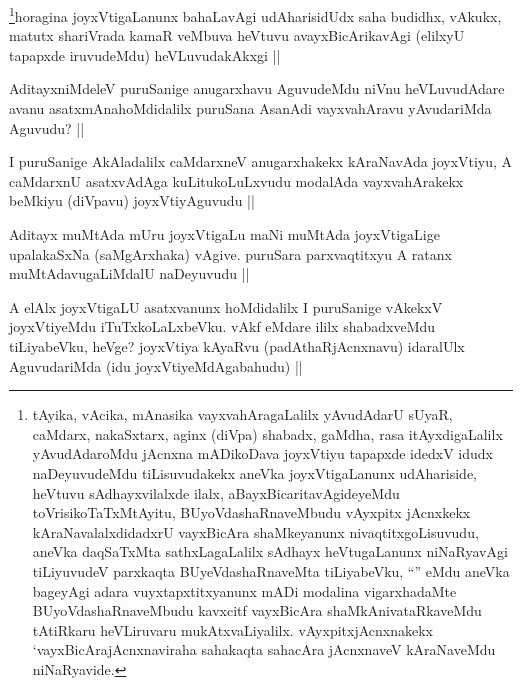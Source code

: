 \begin{artha}
\footnote{tAyika, vAcika, mAnasika vayxvahAragaLalilx yAvudAdarU sUyaR, caMdarx, nakaSxtarx, aginx (diVpa) shabadx, gaMdha, rasa itAyxdigaLalilx yAvudAdaroMdu jAcnxna mADikoDava joyxVtiyu tapapxde idedxV idudx naDeyuvudeMdu tiLisuvudakekx aneVka joyxVtigaLanunx udAhariside, heVtuvu sAdhayxvilalxde ilalx, aBayxBicaritavAgideyeMdu toVrisikoTaTxMtAyitu, BUyoVdashaRnaveMbudu vAyxpitx jAcnxkekx kAraNavalalxdidadxrU vayxBicAra shaMkeyanunx nivaqtitxgoLisuvudu, aneVka daqSaTxMta sathxLagaLalilx sAdhayx heVtugaLanunx niNaRyavAgi tiLiyuvudeV parxkaqta BUyeVdashaRnaveMta tiLiyabeVku, ``\stext'' eMdu aneVka bageyAgi adara vuyxtapxtitxyanunx mADi modalina vigarxhadaMte BUyoVdashaRnaveMbudu kavxcitf vayxBicAra shaMkAnivataRkaveMdu tAtiRkaru heVLiruvaru mukAtxvaLiyalilx. vAyxpitxjAcnxnakekx `vayxBicArajAcnxnaviraha sahakaqta sahacAra jAcnxnaveV kAraNaveMdu niNaRyavide.}horagina joyxVtigaLanunx bahaLavAgi udAharisidUdx saha budidhx, vAkukx, matutx shariVrada kamaR veMbuva heVtuvu avayxBicArikavAgi (elilxyU tapapxde iruvudeMdu) heVLuvudakAkxgi ||
\end{artha}

\begin{artha}
AditayxniMdeleV puruSanige anugarxhavu AguvudeMdu niVnu heVLuvudAdare avanu asatxmAnahoMdidalilx puruSana AsanAdi vayxvahAravu yAvudariMda Aguvudu? ||
\end{artha}

\begin{artha}
I puruSanige AkAladalilx caMdarxneV anugarxhakekx kAraNavAda joyxVtiyu, A caMdarxnU asatxvAdAga kuLitukoLuLxvudu modalAda vayxvahArakekx beMkiyu (diVpavu) joyxVtiyAguvudu ||
\end{artha}

\begin{artha}
Aditayx muMtAda mUru joyxVtigaLu maNi muMtAda joyxVtigaLige upalakaSxNa (saMgArxhaka) vAgive. puruSara parxvaqtitxyu A ratanx muMtAdavugaLiMdalU naDeyuvudu ||
\end{artha}

\begin{artha}
A elAlx joyxVtigaLU asatxvanunx hoMdidalilx I puruSanige vAkekxV joyxVtiyeMdu iTuTxkoLaLxbeVku. vAkf eMdare ililx shabadxveMdu tiLiyabeVku, heVge? joyxVtiya kAyaRvu (padAthaRjAcnxnavu) idaralUlx AguvudariMda (idu joyxVtiyeMdAgabahudu) ||
\end{artha}


